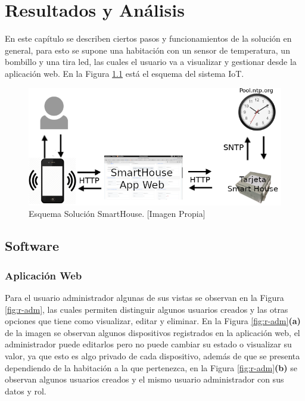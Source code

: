 \chapter{Resultados y Análisis}

En este capítulo se describen ciertos pasos y funcionamientos de la solución en general, para esto se supone una habitación con un sensor de temperatura, un bombillo y una tira led, las cuales el usuario va a visualizar y gestionar desde la aplicación web. En la Figura \ref{fig:iot} está el esquema del sistema IoT.

\begin{figure}[H]
	\centering
	\caption[Esquema Solución SmartHouse.]{Esquema Solución SmartHouse. [Imagen Propia]}
	\label{fig:iot}
	\includegraphics[width=0.7\linewidth]{Imagenes/IOT}
\end{figure}

\section{Software}

\subsection{Aplicación Web}

Para el usuario administrador algunas de sus vistas se observan en la Figura \ref{fig:r-adm}, las cuales permiten distinguir algunos usuarios creados y las otras opciones que tiene como visualizar, editar y eliminar. En la Figura \ref{fig:r-adm}\textbf{(a)} de la imagen se observan algunos dispositivos registrados en la aplicación web, el administrador puede editarlos pero no puede cambiar su estado o visualizar su valor, ya que esto es algo privado de cada dispositivo, además de que se presenta dependiendo de la habitación a la que pertenezca, en la Figura \ref{fig:r-adm}\textbf{(b)} se observan algunos usuarios creados y el mismo usuario administrador con sus datos y rol.

